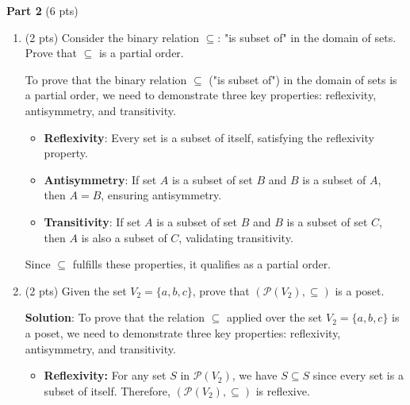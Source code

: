 \documentclass[12pt]{article}
\begin{document}
\begin{spacing}{1.5}
\begin{enumerate}
	\end{enumerate}
			
	\noindent \textbf{Part 2} (6 pts)
			
	\begin{enumerate}
		\item (2 pts) Consider the binary relation $\subseteq$: "is subset of" in the domain of sets. Prove that $\subseteq$ is a partial order.
		      		      
		      To prove that the binary relation $\subseteq$ ("is subset of") in the domain of sets is a partial order, we need to demonstrate three key properties: reflexivity, antisymmetry, and transitivity.
		      		      
		      \begin{itemize}
		      	\item \textbf{Reflexivity}: Every set is a subset of itself, satisfying the reflexivity property.
		      	      		      	      
		      	\item \textbf{Antisymmetry}: If set $A$ is a subset of set $B$ and $B$ is a subset of $A$, then $A = B$, ensuring antisymmetry.
		      	      		      	      
		      	\item \textbf{Transitivity}: If set $A$ is a subset of set $B$ and $B$ is a subset of set $C$, then $A$ is also a subset of $C$, validating transitivity.
		      \end{itemize}
		      		      
		      Since $\subseteq$ fulfills these properties, it qualifies as a partial order.
		      		      
		\item (2 pts) Given the set $V_2=\{a,b,c\}$, prove that $(\mathcal{P}(V_2),\subseteq)$ is a poset.
		      		      
		      \textbf{Solution}: To prove that the relation $\subseteq$ applied over the set $V_2=\{a,b,c\}$ is a poset, we need to demonstrate three key properties: reflexivity, antisymmetry, and transitivity.
		      		              
		      \begin{itemize}
		      	\item \textbf{Reflexivity:}
		      	      For any set \( S \) in \( \mathcal{P}(V_2) \), we have \( S \subseteq S \) since every set is a subset of itself. Therefore, \( (\mathcal{P}(V_2),\subseteq) \) is reflexive.
		      	      		      	                  

\end{itemize}
\end{enumerate}
\end{spacing}
\end{document}
